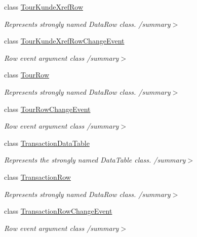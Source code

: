 \begin{DoxyCompactItemize}
class \hyperlink{class_products_1_1_data_1_1ds_sage_1_1_tour_kunde_xref_row}{Tour\+Kunde\+Xref\+Row}
\begin{DoxyCompactList}\small\item\em Represents strongly named Data\+Row class. /summary$>$ \end{DoxyCompactList}\item 
class \hyperlink{class_products_1_1_data_1_1ds_sage_1_1_tour_kunde_xref_row_change_event}{Tour\+Kunde\+Xref\+Row\+Change\+Event}
\begin{DoxyCompactList}\small\item\em Row event argument class /summary$>$ \end{DoxyCompactList}\item 
class \hyperlink{class_products_1_1_data_1_1ds_sage_1_1_tour_row}{Tour\+Row}
\begin{DoxyCompactList}\small\item\em Represents strongly named Data\+Row class. /summary$>$ \end{DoxyCompactList}\item 
class \hyperlink{class_products_1_1_data_1_1ds_sage_1_1_tour_row_change_event}{Tour\+Row\+Change\+Event}
\begin{DoxyCompactList}\small\item\em Row event argument class /summary$>$ \end{DoxyCompactList}\item 
class \hyperlink{class_products_1_1_data_1_1ds_sage_1_1_transaction_data_table}{Transaction\+Data\+Table}
\begin{DoxyCompactList}\small\item\em Represents the strongly named Data\+Table class. /summary$>$ \end{DoxyCompactList}\item 
class \hyperlink{class_products_1_1_data_1_1ds_sage_1_1_transaction_row}{Transaction\+Row}
\begin{DoxyCompactList}\small\item\em Represents strongly named Data\+Row class. /summary$>$ \end{DoxyCompactList}\item 
class \hyperlink{class_products_1_1_data_1_1ds_sage_1_1_transaction_row_change_event}{Transaction\+Row\+Change\+Event}
\begin{DoxyCompactList}\small\item\em Row event argument class /summary$>$ \end{DoxyCompactList}\item 

\end{DoxyCompactItemize}
